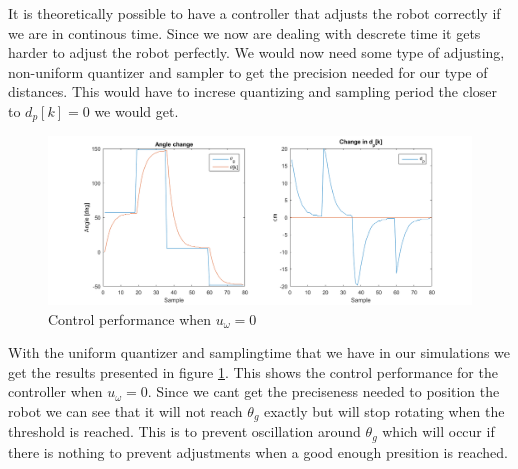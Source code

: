 It is theoretically possible to have a controller that adjusts the robot
correctly if we are in continous time. Since we now are dealing with
descrete time it gets harder to adjust the robot perfectly. We would now
need some type of adjusting, non-uniform quantizer and sampler to get
the precision needed for our type of distances. This would have to
increse quantizing and sampling period the closer to $d_p[k]=0$ we would
get.
\begin{figure}[H]
    \centering
  \includegraphics[width=\textwidth]{../matlab/images/task16.png}
  \caption{Control performance when $u_{\omega}=0$}
  \label{fig:task16}
\end{figure}

With the uniform quantizer and samplingtime that we have in our
simulations we get the results presented in figure \ref{fig:task16}. This shows
the control performance for the controller when $u_{\omega}=0$. Since
we cant get the preciseness needed to position the robot we can see that
it will not reach $\theta_g$ exactly but will stop rotating when the
threshold is reached. This is to prevent oscillation around $\theta_g$
which will occur if there is nothing to prevent adjustments when a good
enough presition is reached.

